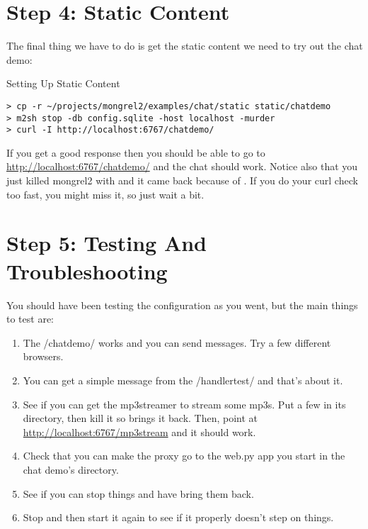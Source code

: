 \section{Step 4: Static Content}

The final thing we have to do is get the static content we need to try
out the chat demo:

\begin{code}{Setting Up Static Content}
\begin{Verbatim}
> cp -r ~/projects/mongrel2/examples/chat/static static/chatdemo
> m2sh stop -db config.sqlite -host localhost -murder
> curl -I http://localhost:6767/chatdemo/
\end{Verbatim}
\end{code}

If you get a good response then you should be able to go to
\url{http://localhost:6767/chatdemo/} and the chat should work.  Notice
also that you just killed mongrel2 with  and it came back
because of .  If you do your curl check too fast,
you might miss it, so just wait a bit.

\section{Step 5: Testing And Troubleshooting}

You should have been testing the configuration as you went, but the
main things to test are:

\begin{enumerate}
\item The /chatdemo/ works and you can send messages. Try a few different
    browsers.
\item You can get a simple message from the /handlertest/ and that's about it.
\item See if you can get the mp3streamer to stream some mp3s.  Put a few
    in its directory, then kill it so  brings it back.  Then,
    point  at \url{http://localhost:6767/mp3stream} and
    it should work.
\item Check that you can make the proxy go to the web.py app you start
    in the chat demo's directory.
\item See if you can stop things and have  bring them back.
\item Stop  and then start it again to see if it properly
    doesn't step on things.
\end{enumerate}

